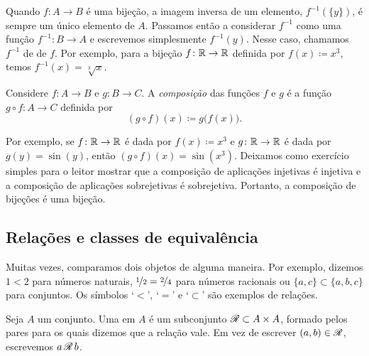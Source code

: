 Quando $f \colon A \to B$ é uma bijeção, a imagem inversa de um elemento,
$f^{-1}(\{y\})$, é sempre um único elemento de $A$. Passamos então a
considerar $f^{-1}$ como uma função
$f^{-1} \colon B \to A$ e escrevemos simplesmente $f^{-1}(y)$.
Nesse caso, chamamos $f^{-1}$ de \emph{} de $f$.
Por exemplo, para a bijeção $f \colon {\mathbb{R}} \to {\mathbb{R}}$ definida por
$f(x) \coloneqq x^3$, temos
$f^{-1}(x) = \sqrt[3]{x}$.


\begin{defn}
Considere $f \colon A \to B$ e $g \colon B \to C$. A
\emph{composi\c{c}\~ao}
das funções $f$ e $g$ é a função
$g \circ f \colon A \to C$ definida por
\begin{equation*}
(g \circ f)(x) \coloneqq g\bigl(f(x)\bigr) .
\end{equation*}
\end{defn}

Por exemplo, se $f \colon {\mathbb{R}} \to {\mathbb{R}}$ é dada por $f(x)\coloneqq x^3$ e
$g \colon {\mathbb{R}} \to {\mathbb{R}}$ é dada por $g(y) = \sin(y)$, então
$(g \circ f)(x) = \sin(x^3)$.
Deixamos como exercício simples para o leitor mostrar que a composição de
aplicações injetivas é injetiva e a composição de aplicações sobrejetivas é
sobrejetiva. Portanto, a composição de bijeções é uma bijeção.

\subsection{Rela\c{c}\~oes e classes de equival\^encia}

Muitas vezes, comparamos dois objetos de alguma maneira. Por exemplo,
dizemos $1 < 2$ para números naturais, $\nicefrac{1}{2} = \nicefrac{2}{4}$
para números racionais ou $\{ a,c \} \subset \{ a,b,c \}$ para conjuntos.
Os símbolos `$<$', `$=$' e `$\subset$' são exemplos de relações.

\begin{defn}
Seja $A$ um conjunto. Uma \emph{}
em $A$ é um subconjunto ${\mathscr{R}} \subset A \times A$,
formado pelos pares para os quais dizemos que a relação vale.
Em vez de escrever $(a,b) \in {\mathscr{R}}$, escrevemos
$a \, {\mathscr{R}} \, b$.
\end{defn}

